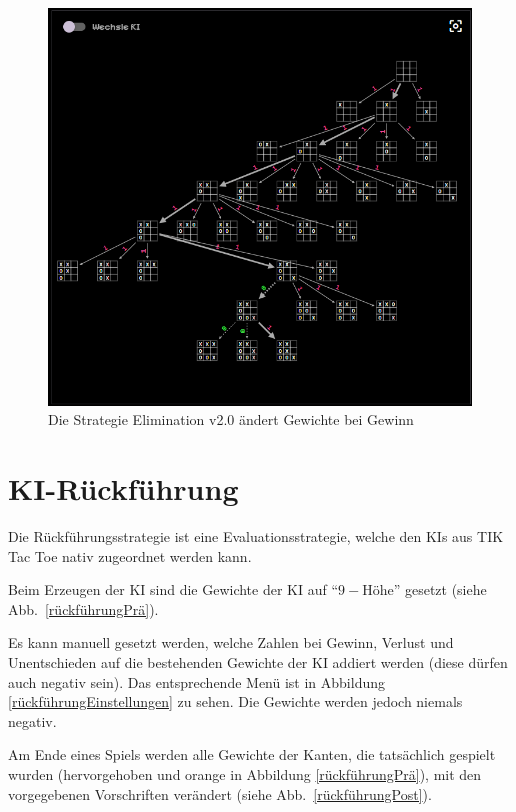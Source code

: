 \documentclass[titlepage]{scrartcl}
\newcommand{\TicTacToe}{TI\reflectbox K Tac Toe}
\begin{document}
\begin{figure}[htb]
\includegraphics[width = \linewidth]{elimination2.png}
\caption{Die Strategie Elimination v2.0 ändert Gewichte bei Gewinn}
\label{elimination2}
\end{figure}

\FloatBarrier
\newpage
\section{KI-Rückführung}
Die Rückführungsstrategie ist eine Evaluationsstrategie, welche den KIs aus \TicTacToe{} nativ zugeordnet werden kann.

Beim Erzeugen der KI sind die Gewichte der KI auf "`\(9-\textrm{H\"ohe}\)"' gesetzt (siehe Abb.~\ref{rückführungPrä}).

Es kann manuell gesetzt werden, welche Zahlen bei Gewinn, Verlust und Unentschieden auf die bestehenden Gewichte der KI addiert werden (diese dürfen auch negativ sein).
Das entsprechende Menü ist in Abbildung \ref{rückführungEinstellungen} zu sehen.
Die Gewichte werden jedoch niemals negativ.

Am Ende eines Spiels werden alle Gewichte der Kanten, die tatsächlich gespielt wurden (hervorgehoben und orange in Abbildung \ref{rückführungPrä}), mit den vorgegebenen Vorschriften verändert (siehe Abb.~\ref{rückführungPost}).
\end{document}
